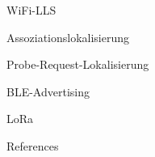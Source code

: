\documentclass[18pt]{beamer}
\begin{document}
\begin{frame}{WiFi-LLS}

\end{frame}

\begin{frame}{Assoziationslokalisierung}

\end{frame}

\begin{frame}{Probe-Request-Lokalisierung}

\end{frame}

\begin{frame}{BLE-Advertising}

\end{frame}

\begin{frame}{LoRa}

\end{frame}

\appendix
\beginbackup

\begin{frame}[allowframebreaks]{References}
\printbibliography
\end{frame}

\backupend
\end{document}
